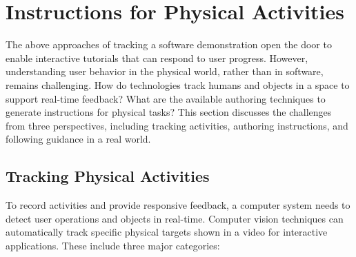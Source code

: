 


\section{Instructions for Physical Activities}
\label{related_physical}

The above approaches of tracking a software demonstration open the door to enable interactive tutorials that can respond to user progress. However, understanding user behavior in the physical world, rather than in software, remains challenging.
%
How do technologies track humans and objects in a space to support real-time feedback? What are the available authoring techniques to generate instructions for physical tasks?
%
This section discusses the challenges from three perspectives, including tracking activities, authoring instructions, and following guidance in a real world.


\subsection{Tracking Physical Activities}
To record activities and provide responsive feedback, a computer system needs to detect user operations and objects in real-time.
%
Computer vision techniques can automatically track specific physical targets shown in a video for interactive applications. These include three major categories:

